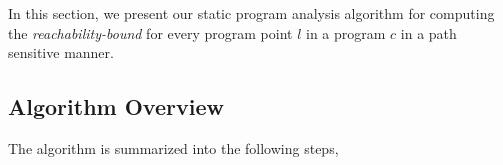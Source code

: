 In this section, we present our static program analysis algorithm for computing 
the \emph{reachability-bound} for every program point $l$ in a program $c$ in a path sensitive manner.
%
\subsection{Algorithm Overview}
\label{sec:alg_overview}
The algorithm is summarized into the following steps,
%
%

